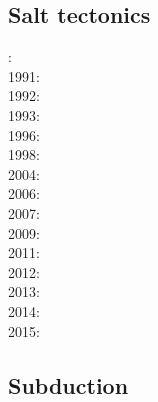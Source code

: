 \subsection*{Salt tectonics}

: \cite{woid78}\\
1991: \cite{tars91}\\
1992: \cite{zaju92}\\
1993: \cite{nabr93}\cite{vasv93}\\
1996: \cite{maar96}\\
1998: \cite{giju98}\\
2004: \cite{istt04}\cite{geim04}\\
2006: \cite{maqs07}\\
2007: \cite{huja07}\cite{maqs07}\\
2009: \cite{grba09}\\
2011: \cite{brfo11}\\
2012: \cite{fejr12}\cite{liqi12}\\
2013: \cite{gobi13}\\
2014: \cite{bakp14}\cite{feka14a}\cite{feka14b}\cite{ghbu14}\\
2015: \cite{feka15}




\subsection*{Subduction}

